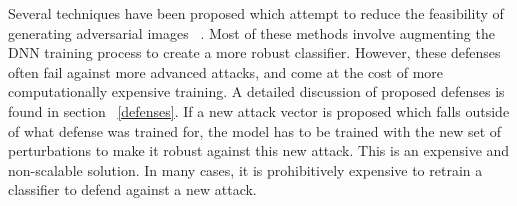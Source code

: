 Several techniques have been proposed which attempt to reduce the feasibility of generating adversarial images ~\cite{Papernot2016DistillationAA,Miyato2015DistributionalSW}. Most of these methods involve augmenting the DNN training process to create a more robust classifier.
However, these defenses often fail against more advanced attacks, and come at the cost of more computationally expensive training. 
A detailed discussion of proposed defenses is found in section ~\ref{defenses}.
If a new attack vector is proposed which falls outside of what defense was trained for, the model has to be trained with the new set of perturbations to make it robust against this new attack. 
This is an expensive and non-scalable solution.
In many cases, it is prohibitively expensive to retrain a classifier to defend against a new attack.

